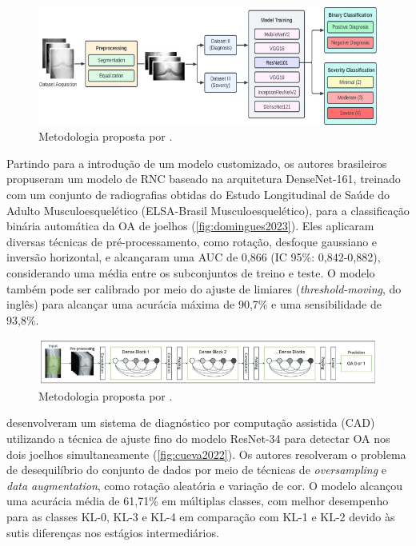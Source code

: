 \begin{figure}[ht]
    \centering
    \includegraphics[width=\textwidth]{figs/mohammed2023.jpg}
    \caption{Metodologia proposta por .}
    \label{fig:mohammed2023}
\end{figure}

Partindo para a introdução de um modelo customizado, os autores brasileiros  propuseram um modelo de RNC baseado na arquitetura DenseNet-161, treinado com um conjunto de radiografias obtidas do Estudo Longitudinal de Saúde do Adulto Musculoesquelético (ELSA-Brasil Musculoesquelético), para a classificação binária automática da OA de joelhos (\autoref{fig:domingues2023}). Eles aplicaram diversas técnicas de pré-processamento, como rotação, desfoque gaussiano e inversão horizontal, e alcançaram uma AUC de 0,866 (IC 95\%: 0,842-0,882), considerando uma média entre os subconjuntos de treino e teste. O modelo também pode ser calibrado por meio do ajuste de limiares (\textit{threshold-moving}, do inglês) para alcançar uma acurácia máxima de 90,7\% e uma sensibilidade de 93,8\%.

\begin{figure}[ht]
    \centering
    \includegraphics[width=\textwidth]{figs/domingues2023.png}
    \caption{Metodologia proposta por .}
    \label{fig:domingues2023}
\end{figure}

 desenvolveram um sistema de diagnóstico por computação assistida (CAD) utilizando a técnica de ajuste fino do modelo ResNet-34 para detectar OA nos dois joelhos simultaneamente (\autoref{fig:cueva2022}). Os autores resolveram o problema de desequilíbrio do conjunto de dados por meio de técnicas de \textit{oversampling} e \textit{data augmentation}, como rotação aleatória e variação de cor. O modelo alcançou uma acurácia média de 61,71\% em múltiplas classes, com melhor desempenho para as classes KL-0, KL-3 e KL-4 em comparação com KL-1 e KL-2 devido às sutis diferenças nos estágios intermediários.

